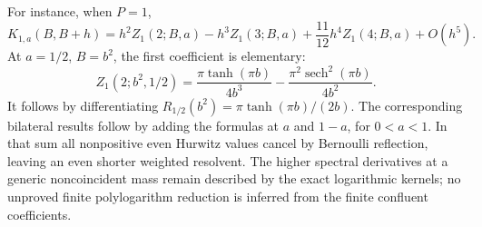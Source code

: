 For instance, when $P=1$,
\[
 K_{1,a}(B,B+h)
 =h^2Z_1(2;B,a)-h^3Z_1(3;B,a)
       +\frac{11}{12}h^4Z_1(4;B,a)+O(h^5).
\]
At $a=1/2$, $B=b^2$, the first coefficient is elementary:
\begin{equation}\label{mm:eq:half-explicit}
 Z_1(2;b^2,1/2)
 =\frac{\pi\tanh(\pi b)}{4b^3}
                     -\frac{\pi^2\operatorname{sech}^2(\pi b)}{4b^2}.
\end{equation}
It follows by differentiating
$R_{1/2}(b^2)=\pi\tanh(\pi b)/(2b)$.
The corresponding bilateral results follow by adding the formulas
at $a$ and $1-a$, for $0<a<1$.  In that sum all nonpositive even
Hurwitz values cancel by Bernoulli reflection, leaving an even shorter
weighted resolvent.  The higher spectral derivatives at a generic
noncoincident mass remain described by the exact logarithmic kernels;
no unproved finite polylogarithm reduction is inferred from the finite
confluent coefficients.

